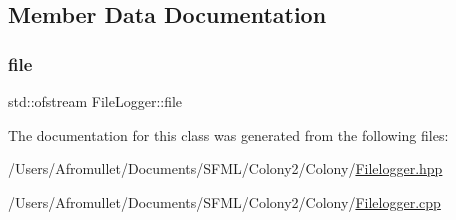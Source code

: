 \subsection{Member Data Documentation}
\mbox{\label{class_file_logger_aa1761aefebbc2a2120600da98b758e88}} 
\subsubsection{\texorpdfstring{file}{file}}
{\footnotesize\ttfamily std\+::ofstream File\+Logger\+::file\hspace{0.3cm}{\ttfamily [private]}}



The documentation for this class was generated from the following files\+:\begin{DoxyCompactItemize}
\item 
/\+Users/\+Afromullet/\+Documents/\+S\+F\+M\+L/\+Colony2/\+Colony/\mbox{\hyperlink{_filelogger_8hpp}{Filelogger.\+hpp}}\item 
/\+Users/\+Afromullet/\+Documents/\+S\+F\+M\+L/\+Colony2/\+Colony/\mbox{\hyperlink{_filelogger_8cpp}{Filelogger.\+cpp}}\end{DoxyCompactItemize}
